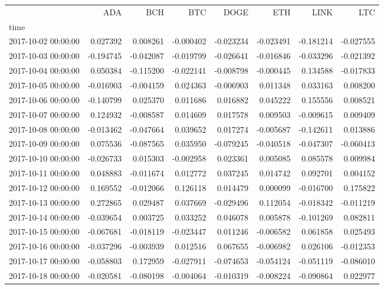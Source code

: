 \begin{tabular}{lrrrrrrr}
\toprule
 & ADA & BCH & BTC & DOGE & ETH & LINK & LTC \\
time &  &  &  &  &  &  &  \\
\midrule
2017-10-02 00:00:00 & 0.027392 & 0.008261 & -0.000402 & -0.023234 & -0.023491 & -0.181214 & -0.027555 \\
2017-10-03 00:00:00 & -0.194745 & -0.042087 & -0.019799 & -0.026641 & -0.016846 & -0.033296 & -0.021392 \\
2017-10-04 00:00:00 & 0.050384 & -0.115200 & -0.022141 & -0.008798 & -0.000445 & 0.134588 & -0.017833 \\
2017-10-05 00:00:00 & -0.016903 & -0.004159 & 0.024363 & -0.006903 & 0.011348 & 0.033163 & 0.008200 \\
2017-10-06 00:00:00 & -0.140799 & 0.025370 & 0.011686 & 0.016882 & 0.045222 & 0.155556 & 0.008521 \\
2017-10-07 00:00:00 & 0.124932 & -0.008587 & 0.014609 & 0.017578 & 0.009503 & -0.009615 & 0.009409 \\
2017-10-08 00:00:00 & -0.013462 & -0.047664 & 0.039652 & 0.017274 & -0.005687 & -0.142611 & 0.013886 \\
2017-10-09 00:00:00 & 0.075536 & -0.087565 & 0.035950 & -0.079245 & -0.040518 & -0.047307 & -0.060413 \\
2017-10-10 00:00:00 & -0.026733 & 0.015303 & -0.002958 & 0.023361 & 0.005085 & 0.085578 & 0.009984 \\
2017-10-11 00:00:00 & 0.048883 & -0.011674 & 0.012772 & 0.037245 & 0.014742 & 0.092701 & 0.004152 \\
2017-10-12 00:00:00 & 0.169552 & -0.012066 & 0.126118 & 0.014479 & 0.000099 & -0.016700 & 0.175822 \\
2017-10-13 00:00:00 & 0.272865 & 0.029487 & 0.037669 & -0.029496 & 0.112054 & -0.018342 & -0.011219 \\
2017-10-14 00:00:00 & -0.039654 & 0.003725 & 0.033252 & 0.046078 & 0.005878 & -0.101269 & 0.082811 \\
2017-10-15 00:00:00 & -0.067681 & -0.018119 & -0.023447 & 0.011246 & -0.006582 & 0.061858 & 0.025493 \\
2017-10-16 00:00:00 & -0.037296 & -0.003939 & 0.012516 & 0.067655 & -0.006982 & 0.026106 & -0.012353 \\
2017-10-17 00:00:00 & -0.058803 & 0.172959 & -0.027911 & -0.074653 & -0.054124 & -0.051119 & -0.086010 \\
2017-10-18 00:00:00 & -0.020581 & -0.080198 & -0.004064 & -0.010319 & -0.008224 & -0.090864 & 0.022977 \\

\end{tabular}
